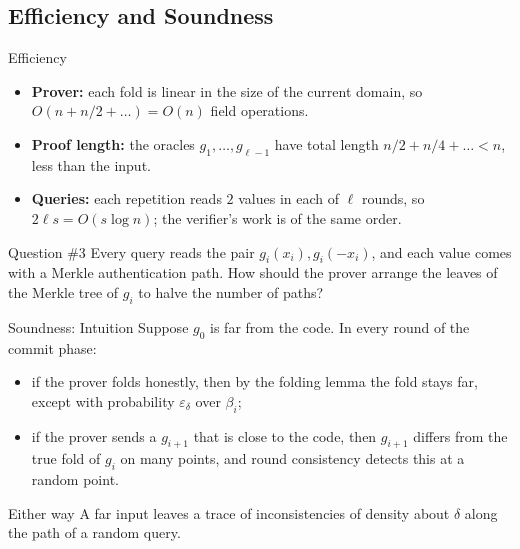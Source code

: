 \documentclass{zkdl-presentation-template}
\begin{document}
    \subsection{Efficiency and Soundness}

    \begin{frame}{Efficiency}
        \begin{itemize}
            \item \textbf{Prover:} each fold is linear in the size of the current domain, so $O(n + n/2 + \dots) = O(n)$ field operations.\pause
            \item \textbf{Proof length:} the oracles $g_1, \dots, g_{\ell-1}$ have total length $n/2 + n/4 + \dots < n$, less than the input.\pause
            \item \textbf{Queries:} each repetition reads $2$ values in each of $\ell$ rounds, so $2\ell s = O(s \log n)$; the verifier's work is of the same order.
        \end{itemize}
        \pause

        \begin{questionblock}{Question \#3}
            Every query reads the pair $g_i(x_i), g_i(-x_i)$, and each value comes with a Merkle authentication path. How should the prover arrange the leaves of the Merkle tree of $g_i$ to halve the number of paths?
        \end{questionblock}
    \end{frame}

    \begin{frame}{Soundness: Intuition}
        Suppose $g_0$ is far from the code. In every round of the commit phase:
        \begin{itemize}
            \item if the prover folds honestly, then by the folding lemma the fold stays far, except with probability $\varepsilon_\delta$ over $\beta_i$;\pause
            \item if the prover sends a $g_{i+1}$ that is close to the code, then $g_{i+1}$ differs from the true fold of $g_i$ on many points, and round consistency detects this at a random point.
        \end{itemize}
        \pause

        \begin{remarkblock}{Either way}
            A far input leaves a trace of inconsistencies of density about $\delta$ along the path of a random query.
        \end{remarkblock}
    \end{frame}
\end{document}
